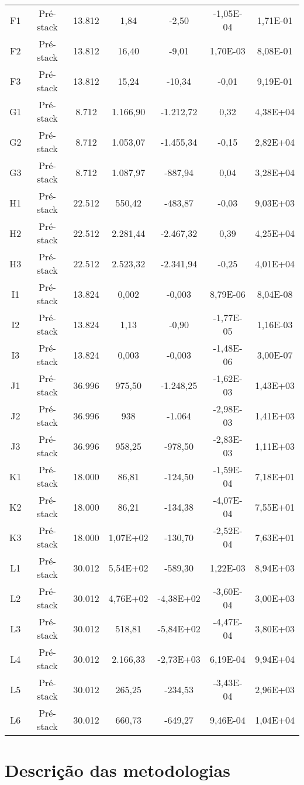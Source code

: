 \begin{center}
\begin{longtable}{ccccccc}
F1&Pré-stack&13.812&1,84&-2,50&-1,05E-04&1,71E-01\\
F2&Pré-stack&13.812&16,40&-9,01&1,70E-03&8,08E-01\\
F3&Pré-stack&13.812&15,24&-10,34&-0,01&9,19E-01\\
G1&Pré-stack&8.712&1.166,90&-1.212,72&0,32&4,38E+04\\
G2&Pré-stack&8.712&1.053,07&-1.455,34&-0,15&2,82E+04\\
G3&Pré-stack&8.712&1.087,97&-887,94&0,04&3,28E+04\\
H1&Pré-stack&22.512&550,42&-483,87&-0,03&9,03E+03\\
H2&Pré-stack&22.512&2.281,44&-2.467,32&0,39&4,25E+04\\
H3&Pré-stack&22.512&2.523,32&-2.341,94&-0,25&4,01E+04\\
I1&Pré-stack&13.824&0,002&-0,003&8,79E-06&8,04E-08\\
I2&Pré-stack&13.824&1,13&-0,90&-1,77E-05&1,16E-03\\
I3&Pré-stack&13.824&0,003&-0,003&-1,48E-06&3,00E-07\\
J1&Pré-stack&36.996&975,50&-1.248,25&-1,62E-03&1,43E+03\\
J2&Pré-stack&36.996&938&-1.064&-2,98E-03&1,41E+03\\
J3&Pré-stack&36.996&958,25&-978,50&-2,83E-03&1,11E+03\\
K1&Pré-stack&18.000&86,81&-124,50&-1,59E-04&7,18E+01\\
K2&Pré-stack&18.000&86,21&-134,38&-4,07E-04&7,55E+01\\
K3&Pré-stack&18.000&1,07E+02&-130,70&-2,52E-04&7,63E+01\\
L1&Pré-stack&30.012&5,54E+02&-589,30&1,22E-03&8,94E+03\\
L2&Pré-stack&30.012&4,76E+02&-4,38E+02&-3,60E-04&3,00E+03\\
L3&Pré-stack&30.012&518,81&-5,84E+02&-4,47E-04&3,80E+03\\
L4&Pré-stack&30.012&2.166,33&-2,73E+03&6,19E-04&9,94E+04\\
L5&Pré-stack&30.012&265,25&-234,53&-3,43E-04&2,96E+03\\
L6&Pré-stack&30.012&660,73&-649,27&9,46E-04&1,04E+04\\
\end{longtable}
\end{center}

\section{Descrição das metodologias}

